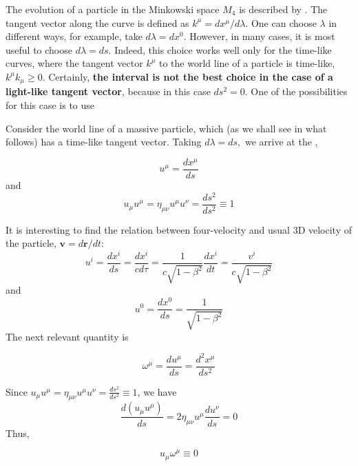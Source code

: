 The evolution of a particle in the Minkowski space $M_{4}$ is described by . The tangent vector along the curve is defined as $k^{\mu}=d x^{\mu} / d \lambda .$ One can choose $\lambda$ in different ways, for example, take $d \lambda=d x^{0} .$ However, in many cases, it is most useful to choose $d \lambda=d s .$ Indeed, this choice works well only for the time-like curves, where the tangent vector $k^{\mu}$ to the world line of a particle is time-like, $k^{\mu} k_{\mu} \geq 0 .$ Certainly, \textbf{the interval is not the best choice in the case of a light-like tangent vector}, because in this case $d s^{2}=0 .$ One of the possibilities for this case is to use 

Consider the world line of a massive particle, which (as we shall see in what follows) has a time-like tangent vector. Taking $d \lambda=d s,$ we arrive at the ,
\begin{qt}
    \begin{equation}
u^{\mu}=\frac{d x^{\mu}}{d s}
\end{equation}
and
\begin{equation}
u_{\mu} u^{\mu}=\eta_{\mu \nu} u^{\mu} u^{\nu}=\frac{d s^{2}}{d s^{2}} \equiv 1
\end{equation}
\end{qt}
It is interesting to find the relation between four-velocity and usual 3D velocity of
the particle, $\mathbf{v}=d\mathbf{r}/dt$:
\begin{equation}
u^{i}=\frac{d x^{i}}{d s}=\frac{d x^{i}}{c d \tau}=\frac{1}{c \sqrt{1-\beta^{2}}} \frac{d x^{i}}{d t}=\frac{v^{i}}{c \sqrt{1-\beta^{2}}}
\end{equation}
and 
\begin{equation}
u^{0}=\frac{d x^{0}}{d s}=\frac{1}{\sqrt{1-\beta^{2}}}
\end{equation}
The next relevant quantity is 
\begin{qt}
    \begin{equation}
\omega^{\mu}=\frac{d u^{\mu}}{d s}=\frac{d^{2} x^{\mu}}{d s^{2}}
\end{equation}
\end{qt}
Since $u_{\mu} u^{\mu}=\eta_{\mu \nu} u^{\mu} u^{\nu}=\frac{d s^{2}}{d s^{2}} \equiv 1$, we have
$$
\frac{d(u_{\mu} u^{\mu})}{ds}=2\eta_{\mu\nu}u^{\mu}\frac{du^{\nu}}{ds}=0
$$
Thus,
\begin{qt}
    \begin{equation}
u_{\mu} \omega^{\mu} \equiv 0
\end{equation}
\end{qt}